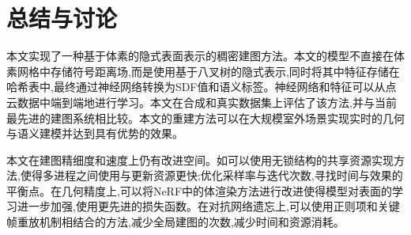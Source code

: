 \section{总结与讨论}\label{conclusion}

本文实现了一种基于体素的隐式表面表示的稠密建图方法。本文的模型不直接在体素网格中存储符号距离场,而是使用基于八叉树的隐式表示,同时将其中特征存储在哈希表中,最终通过神经网络转换为SDF值和语义标签。神经网络和特征可以从点云数据中端到端地进行学习。本文在合成和真实数据集上评估了该方法,并与当前最先进的建图系统相比较。本文的重建方法可以在大规模室外场景实现实时的几何与语义建模并达到具有优势的效果。

本文在建图精细度和速度上仍有改进空间。如可以使用无锁结构的共享资源实现方法,使得多进程之间使用与更新资源更快;优化采样率与迭代次数,寻找时间与效果的平衡点。在几何精度上,可以将NeRF中的体渲染方法进行改进使得模型对表面的学习进一步加强,使用更先进的损失函数。在对抗网络遗忘上,可以使用正则项和关键帧重放机制相结合的方法,减少全局建图的次数,减少时间和资源消耗。


